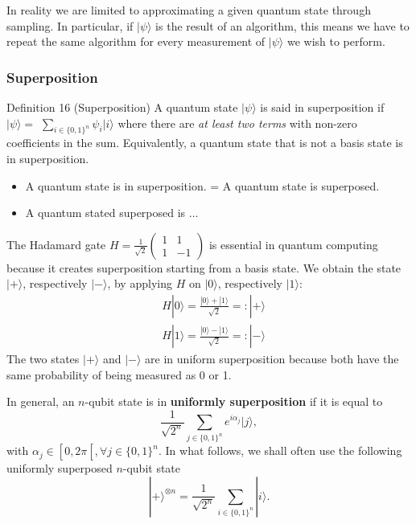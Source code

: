 In reality we are limited to approximating a given quantum state through sampling. In particular, if $|\psi\rangle$ is the result of an algorithm, this means we have to repeat the same algorithm for every measurement of $|\psi\rangle$ we wish to perform.

\subsubsection{Superposition}

Definition 16 (Superposition) A quantum state $|\psi\rangle$ is said in superposition if $|\psi\rangle=$ $\sum_{i \in\{0,1\}^{n}} \psi_{i}|i\rangle$ where there are \textit{at least two terms }with non-zero coefficients in the sum. Equivalently, a quantum state that is not a basis state is in superposition.

\begin{remark}
    \begin{itemize}
        \item A quantum state is in superposition. = A quantum state is superposed. 
        \item A quantum stated superposed is $\dots$
    \end{itemize}
\end{remark}

The Hadamard gate $H=\frac{1}{\sqrt{2}}\left(\begin{array}{cc}1 & 1 \\ 1 & -1\end{array}\right)$ is essential in quantum computing because it creates superposition starting from a basis state. We obtain the state $|+\rangle$, respectively $|-\rangle$, by applying $H$ on $|0\rangle$, respectively $|1\rangle:$
$$
\begin{aligned}
& H|0\rangle=\frac{|0\rangle+|1\rangle}{\sqrt{2}}=:|+\rangle \\
& H|1\rangle=\frac{|0\rangle-|1\rangle}{\sqrt{2}}=:|-\rangle
\end{aligned}
$$
The two states $|+\rangle$ and $|-\rangle$ are in uniform superposition because both have the same probability of being measured as 0 or 1. 

\begin{definition}
    In general, an $n$-qubit state is in \textbf{uniformly superposition} if it is equal to 
$$
\frac{1}{\sqrt{2^{n}}} \sum_{j \in\{0,1\}^{n}} e^{i \alpha_{j}}|j\rangle,
$$
with $\alpha_{j} \in\left[0,2 \pi\left[, \forall j \in\{0,1\}^{n}\right.\right.$. %
In what follows, we shall often use the following uniformly superposed $n$-qubit state 
$$
|+\rangle^{\otimes n}=\frac{1}{\sqrt{2^{n}}} \sum_{i \in\{0,1\}^{n}}|i\rangle.
$$
\end{definition}

